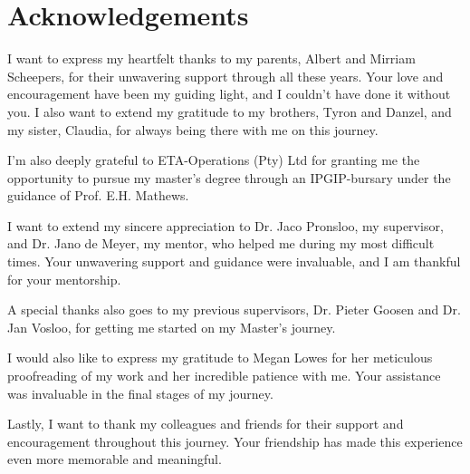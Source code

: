 
\cleardoublepage
{}
\chapter*{Acknowledgements}

I want to express my heartfelt thanks to my parents, Albert and Mirriam Scheepers, for their unwavering support through all these years. Your love and encouragement have been my guiding light, and I couldn't have done it without you. I also want to extend my gratitude to my brothers, Tyron and Danzel, and my sister, Claudia, for always being there with me on this journey.\par I'm also deeply grateful to ETA-Operations (Pty) Ltd for granting me the opportunity to pursue my master's degree through an IPGIP-bursary under the guidance of Prof. E.H. Mathews.\par I want to extend my sincere appreciation to Dr. Jaco Pronsloo, my supervisor, and Dr. Jano de Meyer, my mentor, who helped me during my most difficult times. Your unwavering support and guidance were invaluable, and I am thankful for your mentorship.\par A special thanks also goes to my previous supervisors, Dr. Pieter Goosen and Dr. Jan Vosloo, for getting me started on my Master's journey. \par I would also like to express my gratitude to Megan Lowes for her meticulous proofreading of my work and her incredible patience with me. Your assistance was invaluable in the final stages of my journey. \par Lastly, I want to thank my colleagues and friends for their support and encouragement throughout this journey. Your friendship has made this experience even more memorable and meaningful.